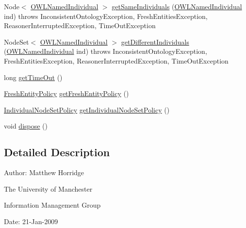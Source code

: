 \begin{DoxyCompactItemize}
\item 
Node$<$ \hyperlink{interfaceorg_1_1semanticweb_1_1owlapi_1_1model_1_1_o_w_l_named_individual}{O\-W\-L\-Named\-Individual} $>$ \hyperlink{interfaceorg_1_1semanticweb_1_1owlapi_1_1reasoner_1_1_o_w_l_reasoner_a48613c6f3b6fe46a06555ab98678d8cd}{get\-Same\-Individuals} (\hyperlink{interfaceorg_1_1semanticweb_1_1owlapi_1_1model_1_1_o_w_l_named_individual}{O\-W\-L\-Named\-Individual} ind)  throws Inconsistent\-Ontology\-Exception, Fresh\-Entities\-Exception, Reasoner\-Interrupted\-Exception, Time\-Out\-Exception
\item 
Node\-Set$<$ \hyperlink{interfaceorg_1_1semanticweb_1_1owlapi_1_1model_1_1_o_w_l_named_individual}{O\-W\-L\-Named\-Individual} $>$ \hyperlink{interfaceorg_1_1semanticweb_1_1owlapi_1_1reasoner_1_1_o_w_l_reasoner_a910b74c5ec0b5e713c9f504a58b3fe5b}{get\-Different\-Individuals} (\hyperlink{interfaceorg_1_1semanticweb_1_1owlapi_1_1model_1_1_o_w_l_named_individual}{O\-W\-L\-Named\-Individual} ind)  throws Inconsistent\-Ontology\-Exception, Fresh\-Entities\-Exception, Reasoner\-Interrupted\-Exception, Time\-Out\-Exception
\item 
long \hyperlink{interfaceorg_1_1semanticweb_1_1owlapi_1_1reasoner_1_1_o_w_l_reasoner_a44b2c968f989afe5290db29c90faa164}{get\-Time\-Out} ()
\item 
\hyperlink{enumorg_1_1semanticweb_1_1owlapi_1_1reasoner_1_1_fresh_entity_policy}{Fresh\-Entity\-Policy} \hyperlink{interfaceorg_1_1semanticweb_1_1owlapi_1_1reasoner_1_1_o_w_l_reasoner_aed649d8b493c102a44a47eececaa3ceb}{get\-Fresh\-Entity\-Policy} ()
\item 
\hyperlink{enumorg_1_1semanticweb_1_1owlapi_1_1reasoner_1_1_individual_node_set_policy}{Individual\-Node\-Set\-Policy} \hyperlink{interfaceorg_1_1semanticweb_1_1owlapi_1_1reasoner_1_1_o_w_l_reasoner_a5c38bc73fa06cb0084c7698878186928}{get\-Individual\-Node\-Set\-Policy} ()
\item 
void \hyperlink{interfaceorg_1_1semanticweb_1_1owlapi_1_1reasoner_1_1_o_w_l_reasoner_abb6136592255c0e212ecefd3c0615c80}{dispose} ()
\end{DoxyCompactItemize}


\subsection{Detailed Description}
Author\-: Matthew Horridge\par
 The University of Manchester\par
 Information Management Group\par
 Date\-: 21-\/\-Jan-\/2009 

